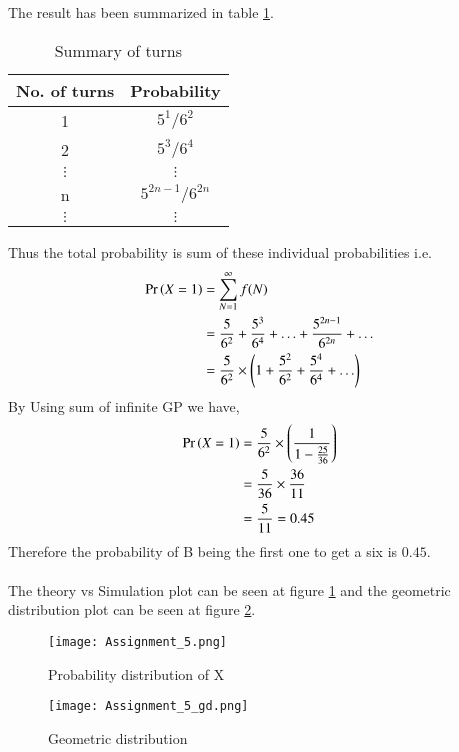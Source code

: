 \documentclass[journal,12pt,twocolumn]{IEEEtran}
\begin{document}
The result has been summarized in table \ref{tab:table geometric distribution}. \\
\begin{table}[hbt!]
\centering
\begin{tabular}{|c|c|}
\hline
\textbf{No. of turns} & \textbf{Probability} \\ \hline
1                     & $5^1/6^2  $            \\ \hline
2                     & $5^3/6^4 $             \\ \hline
$\vdots  $              & $\vdots $              \\
n                     & $5^{2n-1}/6^{2n} $         \\ \hline
$\vdots $               & $\vdots $              \\ \hline
\end{tabular}
\caption{Summary of turns}
\label{tab:table geometric distribution}
\end{table}

Thus the total probability is sum of these individual probabilities i.e.
\begin{align}
    \Pr\left(X=1\right) &= \sum_{N=1}^{\infty} f(N) \\
    &= \frac{5}{6^2} + \frac{5^3}{6^4} + \hdots + \frac{5^{2n-1}}{6^{2n}} +\hdots  \\
    &= \frac{5}{6^2} \times \left(1 + \frac{5^2}{6^2} + \frac{5^4}{6^4} + \hdots \right) 
\end{align}
By Using sum of infinite GP we have, 
\begin{align}
     \Pr\left(X=1\right) &= \frac{5}{6^2} \times \left(\frac{1}{1 - \frac{25}{36}}\right)  \\
       &= \frac{5}{36} \times \frac{36}{11} \\
       &= \frac{5}{11} = 0.45
\end{align}
Therefore the probability of B being the first one to get a six is $ 0.45 $.\\ \\
The theory vs Simulation plot can be seen at figure \ref{fig::Probability distribution} and the geometric distribution plot can be seen at figure \ref{fig::Geometric distribution}.
\begin{figure}[h!]
    \centering
    \texttt{[image: Assignment\_5.png]}
    \caption{Probability distribution of X}
    \label{fig::Probability distribution}
\end{figure}
\begin{figure}[h!]
    \centering
    \texttt{[image: Assignment\_5\_gd.png]}
    \caption{Geometric distribution}
    \label{fig::Geometric distribution}
\end{figure}
\end{document}
